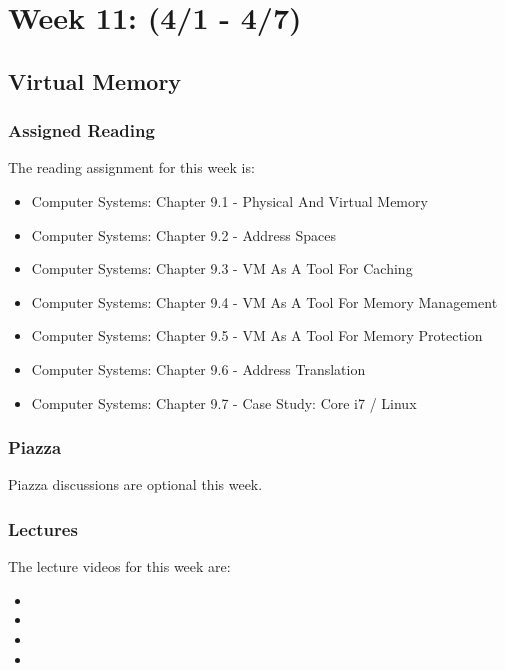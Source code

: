 \clearpage

\renewcommand{\ChapTitle}{Week 11: (4/1 - 4/7)}
\renewcommand{\SectionTitle}{Virtual Memory}

\chapter{\ChapTitle}

\section{\SectionTitle}

\subsection{Assigned Reading}

The reading assignment for this week is:

\begin{itemize}
    \item Computer Systems: Chapter 9.1 - Physical And Virtual Memory
    \item Computer Systems: Chapter 9.2 - Address Spaces
    \item Computer Systems: Chapter 9.3 - VM As A Tool For Caching
    \item Computer Systems: Chapter 9.4 - VM As A Tool For Memory Management
    \item Computer Systems: Chapter 9.5 - VM As A Tool For Memory Protection
    \item Computer Systems: Chapter 9.6 - Address Translation
    \item Computer Systems: Chapter 9.7 - Case Study: Core i7 / Linux
\end{itemize}

\subsection{Piazza}

Piazza discussions are optional this week. 

\subsection{Lectures}

The lecture videos for this week are:

\begin{itemize}
    \item {}
    \item {}
    \item {}
    \item {}
\end{itemize}

